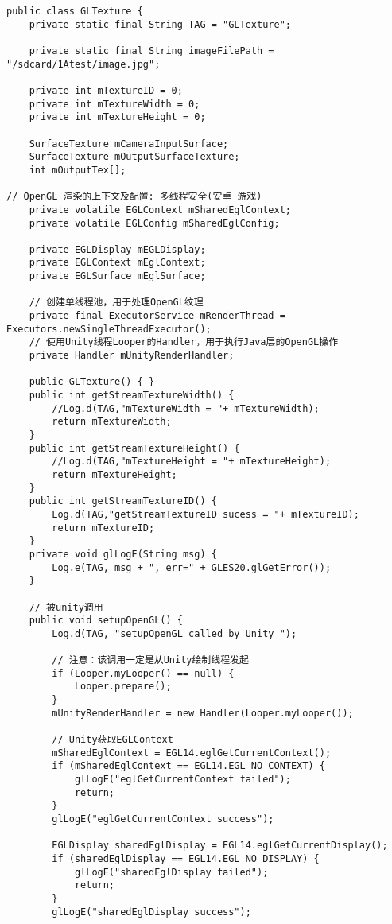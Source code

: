 \documentclass[9pt, b5paper]{article}
\begin{document}
\begin{verbatim}
public class GLTexture {
    private static final String TAG = "GLTexture";

    private static final String imageFilePath = "/sdcard/1Atest/image.jpg";

    private int mTextureID = 0;
    private int mTextureWidth = 0;
    private int mTextureHeight = 0;

    SurfaceTexture mCameraInputSurface;
    SurfaceTexture mOutputSurfaceTexture;
    int mOutputTex[];

// OpenGL 渲染的上下文及配置: 多线程安全(安卓 游戏)
    private volatile EGLContext mSharedEglContext;
    private volatile EGLConfig mSharedEglConfig;

    private EGLDisplay mEGLDisplay;
    private EGLContext mEglContext;
    private EGLSurface mEglSurface;

    // 创建单线程池，用于处理OpenGL纹理
    private final ExecutorService mRenderThread = Executors.newSingleThreadExecutor();
    // 使用Unity线程Looper的Handler，用于执行Java层的OpenGL操作
    private Handler mUnityRenderHandler;

    public GLTexture() { }
    public int getStreamTextureWidth() {
        //Log.d(TAG,"mTextureWidth = "+ mTextureWidth);
        return mTextureWidth;
    }
    public int getStreamTextureHeight() {
        //Log.d(TAG,"mTextureHeight = "+ mTextureHeight);
        return mTextureHeight;
    }
    public int getStreamTextureID() {
        Log.d(TAG,"getStreamTextureID sucess = "+ mTextureID);
        return mTextureID;
    }
    private void glLogE(String msg) {
        Log.e(TAG, msg + ", err=" + GLES20.glGetError());
    }

    // 被unity调用
    public void setupOpenGL() {
        Log.d(TAG, "setupOpenGL called by Unity ");

        // 注意：该调用一定是从Unity绘制线程发起
        if (Looper.myLooper() == null) {
            Looper.prepare();
        }
        mUnityRenderHandler = new Handler(Looper.myLooper());

        // Unity获取EGLContext
        mSharedEglContext = EGL14.eglGetCurrentContext();
        if (mSharedEglContext == EGL14.EGL_NO_CONTEXT) {
            glLogE("eglGetCurrentContext failed");
            return;
        }
        glLogE("eglGetCurrentContext success");

        EGLDisplay sharedEglDisplay = EGL14.eglGetCurrentDisplay();
        if (sharedEglDisplay == EGL14.EGL_NO_DISPLAY) {
            glLogE("sharedEglDisplay failed");
            return;
        }
        glLogE("sharedEglDisplay success");


\end{verbatim}
\end{document}
